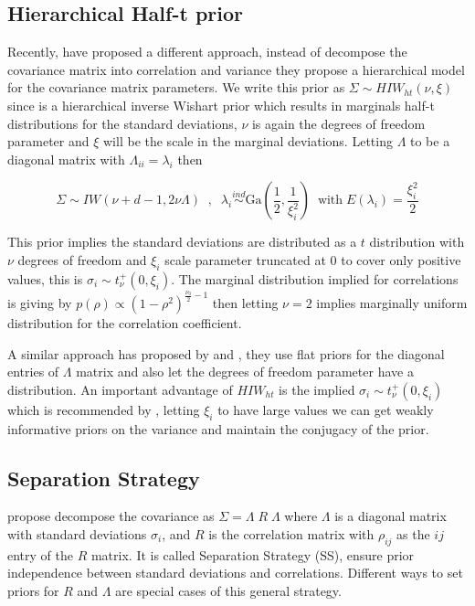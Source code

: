 \documentclass[a4paper]{article}
\begin{document}
\subsection{Hierarchical Half-t prior}

Recently, \cite{huang2013simple} have proposed a different approach, instead of decompose the covariance matrix into correlation and variance they propose a hierarchical model for the covariance matrix parameters. We write this prior as $\Sigma \sim HIW_{ht}(\nu, \xi)$ since is a hierarchical inverse Wishart prior which results in marginals half-t distributions for the standard deviations, $\nu$ is again the degrees of freedom parameter and $\xi$ will be the scale in the marginal deviations.   Letting  $\Lambda$ to be a diagonal matrix with $\Lambda_{ii} =\lambda_i $ then

\begin{equation}
\Sigma \sim IW( \nu + d - 1 ,  2\nu\Lambda) \;\;,\;\;  \lambda_i  \stackrel{ind} \sim \mbox{Ga}(\frac{1}{2} , \frac{1}{\xi_i^2}) \;\; \mbox{with} \; E(\lambda_i)=\frac{\xi_i^2}{2} 
\label{eq:ht}
\end{equation}

This prior implies the standard deviations are distributed as a $t$ distribution with $\nu$ degrees of freedom and $\xi_i$ scale parameter truncated at 0 to cover only positive values, this is $\sigma_i \sim t_{\nu}^{+}(0, \xi_i)$.  The marginal distribution implied for correlations is giving by $p(\rho) \propto (1-\rho^2)^{\frac{\nu_0}{2}-1}$ then letting $\nu=2$ implies marginally uniform distribution for the correlation coefficient. 

A similar approach has proposed by \cite{daniels1999} and \cite{matilde}, they use flat priors for the diagonal entries of $\Lambda$ matrix and also let the degrees of freedom parameter have a distribution.  An important advantage of  $HIW_{ht}$ is the implied $\sigma_i \sim t_{\nu}^{+}(0, \xi_i)$ which is recommended by \cite{gelman2006prior}, letting $\xi_i$ to have large values we can get weakly informative priors on the variance and maintain the conjugacy of the prior.  

\subsection{Separation Strategy \label{ss.sec} }

\cite{barnard2000} propose decompose the covariance as $\Sigma = \Lambda \; R \; \Lambda$  where $\Lambda$ is a diagonal matrix with  standard deviations $\sigma_{i}$, and $R$ is the correlation matrix with $\rho_{ij}$  as the $ij$ entry of the $R$ matrix. It is called Separation Strategy (SS), ensure prior independence between standard deviations and correlations.  Different ways to set priors for $R$ and $\Lambda$ are special cases of this general strategy. 
\end{document}
